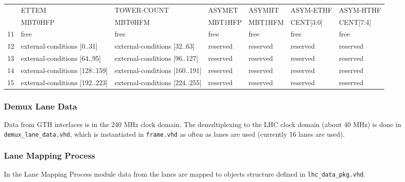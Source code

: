 \begin{table}
\begin{tabular}{c|m{}|m{}|m{}|m{}|m{}|m{}|}
\multicolumn{1}{|c|}{} &
\multicolumn{1}{l|}{ETTEM} & TOWER-COUNT & ASYMET & ASYMHT & ASYM-ETHF & ASYM-HTHF \\
\multicolumn{1}{|c|}{} &
\multicolumn{1}{l|}{MBT0HFP} & MBT0HFM & MBT1HFP & MBT1HFM & CENT[3:0] & CENT[7:4] \\\hline
\multicolumn{1}{|c|}{11} & free & free & free & free & free & free \\\hline
\multicolumn{1}{|c|}{12} & external-conditions [0..31] & external-conditions [32..63] & reserved & reserved & reserved & reserved \\\hline
\multicolumn{1}{|c|}{13} & external-conditions [64..95] & external-conditions [96..127] & reserved & reserved & reserved & reserved \\\hline
\multicolumn{1}{|c|}{14} & external-conditions [128..159] & external-conditions [160..191] & reserved & reserved & reserved & reserved \\\hline
\multicolumn{1}{|c|}{15} & external-conditions [192..223] & external-conditions [224..255] & reserved & reserved & reserved & reserved \\\hline
\end{tabular}
\label{tab:framework:tab_configuration_optical_conn}
\end{table}

\clearpage

%
%

\subsubsection{Demux Lane Data} \label{sec:framework:demux_lane_data}
Data from GTH interfaces is in the 240 MHz clock domain. The demultiplexing to the LHC clock domain (about 40 MHz) is done in \texttt{demux\_lane\_data.vhd}, which is instantiated in \texttt{frame.vhd} as often as lanes are used (currently 16 lanes are used).

%
%

\subsubsection{Lane Mapping Process} \label{sec:framework:lmp}
In the Lane Mapping Process module data from the lanes are mapped to objects structure defined in \texttt{lhc\_data\_pkg.vhd}.


